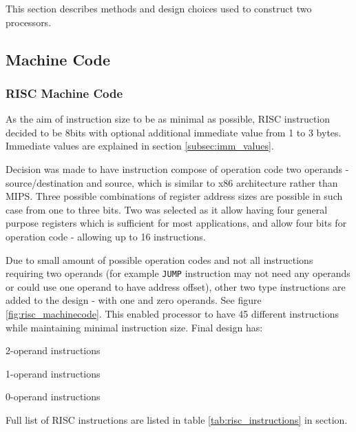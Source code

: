 This section describes methods and design choices used to construct two processors.

\subsection{Machine Code}\label{subsec:machine_code}

\subsubsection{RISC Machine Code}
As the aim of instruction size to be as minimal as possible, RISC instruction decided to be 8bits with optional additional immediate value from 1 to 3 bytes. Immediate values are explained in section \ref{subsec:imm_values}.

Decision was made to have instruction compose of operation code two operands - source/destination and source, which is similar to x86 architecture rather than MIPS. Three possible combinations of register address sizes are possible in such case from one to three bits. Two was selected as it allow having four general purpose registers which is sufficient for most applications, and allow four bits for operation code - allowing up to 16 instructions. 

Due to small amount of possible operation codes and not all instructions requiring two operands (for example \texttt{JUMP} instruction may not need any operands or could use one operand to have address offset), other two type instructions are added to the design - with one and zero operands. See figure \ref{fig:risc_machinecode}. This enabled processor to have 45 different instructions while maintaining minimal instruction size. Final design has:
\begin{description}[labelindent=1cm, labelsep=1em]
	\item[$\bullet$ \textbf{8 }]  2-operand instructions
	\item[$\bullet$ \textbf{32}]  1-operand instructions
	\item[$\bullet$ \textbf{5 }]  0-operand instructions
\end{description}
Full list of RISC instructions are listed in table \ref{tab:risc_instructions} in  section.

